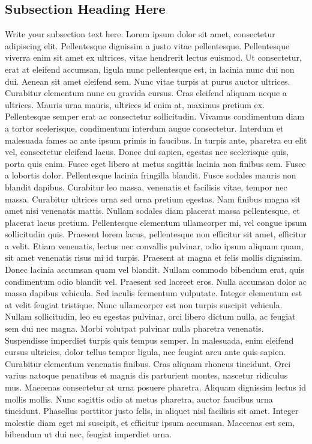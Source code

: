 \documentclass{article}
\begin{document}
\subsection{Subsection Heading Here}
Write your subsection text here.
Lorem ipsum dolor sit amet, consectetur adipiscing elit. Pellentesque dignissim a justo vitae pellentesque. Pellentesque viverra enim sit amet ex ultrices, vitae hendrerit lectus euismod. Ut consectetur, erat at eleifend accumsan, ligula nunc pellentesque est, in lacinia nunc dui non dui. Aenean sit amet eleifend sem. Nunc vitae turpis at purus auctor ultrices. Curabitur elementum nunc eu gravida cursus. Cras eleifend aliquam neque a ultrices. Mauris urna mauris, ultrices id enim at, maximus pretium ex. Pellentesque semper erat ac consectetur sollicitudin. Vivamus condimentum diam a tortor scelerisque, condimentum interdum augue consectetur. Interdum et malesuada fames ac ante ipsum primis in faucibus. In turpis ante, pharetra eu elit vel, consectetur eleifend lacus. Donec dui sapien, egestas nec scelerisque quis, porta quis enim. Fusce eget libero at metus sagittis lacinia non finibus sem. Fusce a lobortis dolor.
Pellentesque lacinia fringilla blandit. Fusce sodales mauris non blandit dapibus. Curabitur leo massa, venenatis et facilisis vitae, tempor nec massa. Curabitur ultrices urna sed urna pretium egestas. Nam finibus magna sit amet nisi venenatis mattis. Nullam sodales diam placerat massa pellentesque, et placerat lacus pretium. Pellentesque elementum ullamcorper mi, vel congue ipsum sollicitudin quis. Praesent lorem lacus, pellentesque non efficitur sit amet, efficitur a velit. Etiam venenatis, lectus nec convallis pulvinar, odio ipsum aliquam quam, sit amet venenatis risus mi id turpis. Praesent at magna et felis mollis dignissim. Donec lacinia accumsan quam vel blandit. Nullam commodo bibendum erat, quis condimentum odio blandit vel. Praesent sed laoreet eros. Nulla accumsan dolor ac massa dapibus vehicula. Sed iaculis fermentum vulputate.
Integer elementum est at velit feugiat tristique. Nunc ullamcorper est non turpis suscipit vehicula. Nullam sollicitudin, leo eu egestas pulvinar, orci libero dictum nulla, ac feugiat sem dui nec magna. Morbi volutpat pulvinar nulla pharetra venenatis. Suspendisse imperdiet turpis quis tempus semper. In malesuada, enim eleifend cursus ultricies, dolor tellus tempor ligula, nec feugiat arcu ante quis sapien. Curabitur elementum venenatis finibus. Cras aliquam rhoncus tincidunt. Orci varius natoque penatibus et magnis dis parturient montes, nascetur ridiculus mus. Maecenas consectetur at urna posuere pharetra. Aliquam dignissim lectus id mollis mollis. Nunc sagittis odio at metus pharetra, auctor faucibus urna tincidunt. Phasellus porttitor justo felis, in aliquet nisl facilisis sit amet. Integer molestie diam eget mi suscipit, et efficitur ipsum accumsan. Maecenas est sem, bibendum ut dui nec, feugiat imperdiet urna.
\end{document}
